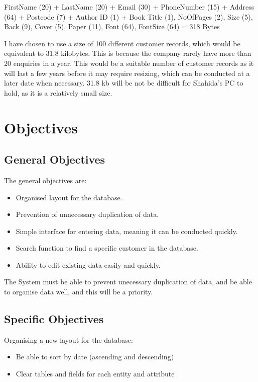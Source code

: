 FirstName (20) + LastName (20) + Email (30) + PhoneNumber (15) + Address (64) + Postcode (7) + Author ID (1) + Book Title (1), NoOfPages (2), Size (5), Back (9), Cover (5), Paper (11), Font (64), FontSize (64) = 318 Bytes

I have chosen to use a size of 100 different customer records, which would be equivalent to 31.8 kilobytes. This is because the company rarely have more than 20 enquiries in a year. This would be a suitable number of customer records as it will last a few years before it may require resizing, which can be conducted at a later date when necessary. 31.8 kb will be not be difficult for Shahida's PC to hold, as it is a relatively small size.

\section{Objectives}

\subsection{General Objectives}

The general objectives are:
\begin{itemize}
    \item Organised layout for the database.
    \item Prevention of unnecessary duplication of data.
    \item Simple interface for entering data, meaning it can be conducted quickly.
    \item Search function to find a specific customer in the database.
    \item Ability to edit existing data easily and quickly.
\end{itemize}

The System must be able to prevent unecessary duplication of data, and be able to organise data well, and this will be a priority.


\subsection{Specific Objectives}

Organising a new layout for the database:

\begin{itemize}
    \item Be able to sort by date (ascending and descending)
    \item Clear tables and fields for each entity and attribute
\end{itemize}


